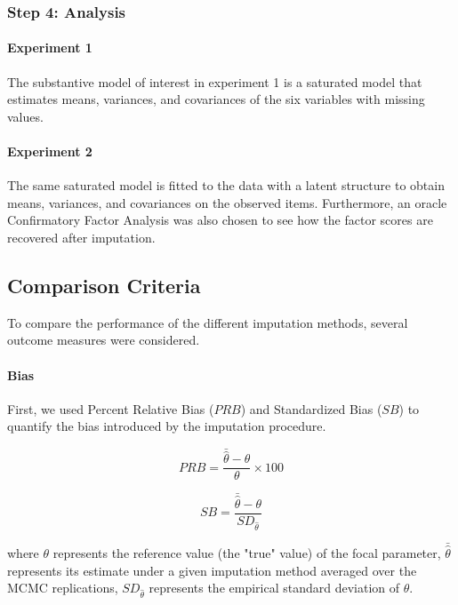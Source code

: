 \subsubsection{Step 4: Analysis}
	
	\paragraph{Experiment 1}
	The substantive model of interest in experiment 1 is a saturated model that estimates means,
	variances, and covariances of the six variables with missing values.

	\paragraph{Experiment 2}
	The same saturated model is fitted to the data with a latent structure to obtain means, variances, 
	and covariances on the observed items.
	Furthermore, an oracle Confirmatory Factor Analysis was also chosen to see how the factor scores 
	are recovered after imputation.

\subsection{Comparison Criteria} \label{criteria}
	To compare the performance of the different imputation methods, several outcome measures were considered.

	\paragraph{Bias}

	First, we used Percent Relative Bias ($PRB$) and Standardized Bias ($SB$) to quantify the bias introduced by the imputation
	procedure.

	\begin{equation} \label{eqn:prb}
		PRB = \frac{\bar{\hat{\theta}} - \theta}{\theta} \times 100
	\end{equation}

	\begin{equation} \label{eqn:sb}
		SB =  \frac{\bar{\hat{\theta}} - \theta}{SD_{\hat{\theta}}}
	\end{equation}
	
	where $\theta$ represents the reference value (the "true" value) of the focal parameter, 
	$\bar{\hat{\theta}}$ represents its estimate under a given imputation method averaged over 
	the MCMC replications, 
	$SD_{\hat{\theta}}$ represents the empirical standard deviation of $\theta$.

